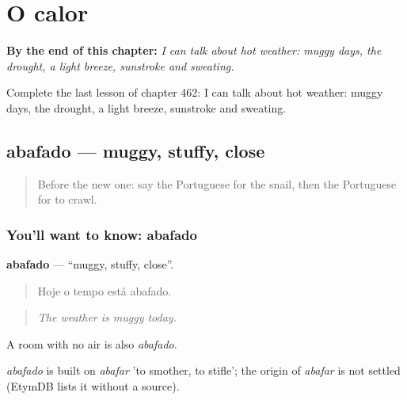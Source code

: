 
\chapter{O calor}
\label{ch:pt-o-calor}

\begin{chapteropening}
\textbf{By the end of this chapter:} \emph{I can talk about hot weather: muggy days, the drought, a light breeze, sunstroke and sweating.}

Complete the last lesson of chapter 462: I can talk about hot weather: muggy days, the drought, a light breeze, sunstroke and sweating.
\end{chapteropening}

\section[abafado]{abafado — muggy, stuffy, close}

\label{lesson:PT-C462-abafado}



\begin{quote}
Before the new one: say the Portuguese for the snail, then the Portuguese for to crawl.
\end{quote}

\subsection*{You'll want to know: abafado}
\textbf{abafado} — \textquotedblleft{}muggy, stuffy, close\textquotedblright{}.

\begin{quote}
Hoje o tempo está abafado.
\end{quote}

\begin{quote}
\emph{The weather is muggy today.}
\end{quote}

A room with no air is also \emph{abafado}.

\begin{cousinweb}
\emph{abafado} is built on \emph{abafar} 'to smother, to stifle'; the origin of \emph{abafar} is not settled (EtymDB lists it without a source).
\end{cousinweb}

